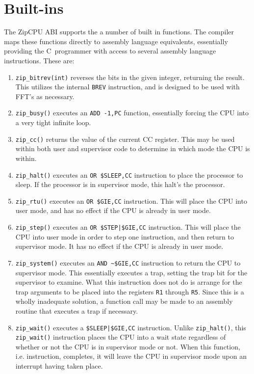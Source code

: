 \documentclass{gqtekspec}
\begin{document}
\section{Built-ins}\label{sec:abi-builtin}
The ZipCPU ABI supports the a number of built in functions.  The compiler
maps these functions directly to assembly language equivalents, essentially 
providing the C~programmer with access to several assembly language
instructions.  These are:
\begin{enumerate}
\item {\tt zip\_bitrev(int)} reverses the bits in the given integer, returning
	the result.  This utilizes the internal {\tt BREV} instruction, and is
	designed to be used with FFT's as necessary.
\item {\tt zip\_busy()} executes an {\tt ADD -1,PC} function, essentially
	forcing the CPU into a very tight infinite loop.
\item {\tt zip\_cc()} returns the value of the current CC register.  This may
	be used within both user and supervisor code to determine in which
	mode the CPU is within.
\item {\tt zip\_halt()} executes an \hbox{\tt OR \$SLEEP,CC} instruction to
	place the processor to sleep.  If the processor is in supervisor mode,
	this halt's the processor.
\item {\tt zip\_rtu()} executes an \hbox{\tt OR \$GIE,CC} instruction.  This
	will place the CPU into user mode, and has no effect if the CPU is
	already in user mode.
\item {\tt zip\_step()} executes an \hbox{\tt OR \$STEP|\$GIE,CC} instruction.
	This will place the CPU into user mode in order to step one instruction,
	and then return to supervisor mode.
	It has no effect if the CPU is already in user mode.
\item {\tt zip\_system()} executes an \hbox{\tt AND \textasciitilde\$GIE,CC}
	instruction to return the CPU to supervisor mode.  This essentially
	executes a trap, setting the trap bit for the supervisor to examine. 
	What this instruction does not do is arrange for the trap arguments to
	be placed into the  registers {\tt R1} through {\tt R5}.  Since this is
	a wholly inadequate solution, a function call may be made to an
	assembly routine that executes a trap if necessary.
\item {\tt zip\_wait()} executes a \hbox{\tt \$SLEEP|\$GIE,CC} instruction.
	Unlike {\tt zip\_halt()}, this {\tt zip\_wait()} instruction places
	the CPU into a wait state regardless of whether or not the CPU is
	in supervisor mode or not.   When this function, i.e. instruction,
	completes, it will leave the CPU in supervisor mode upon an interrupt
	having taken place.


\end{enumerate}
\end{document}
